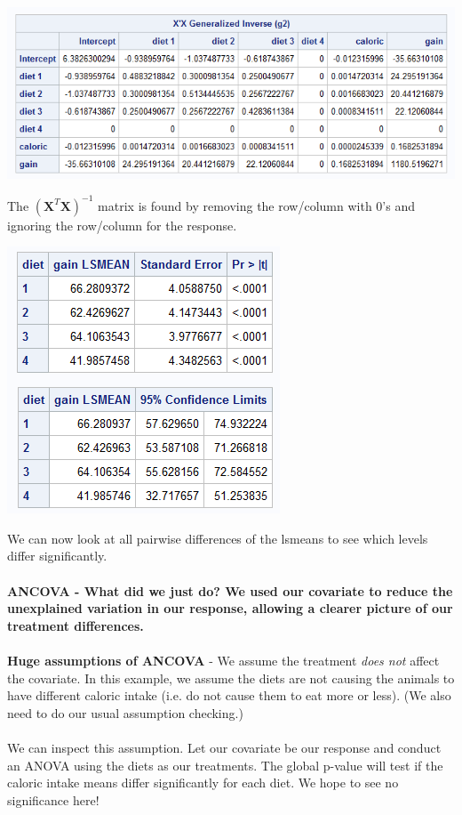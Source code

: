 \begin{center}
\includegraphics{DietsInverse}
\end{center}

The $(\textbf{X}^{T}\textbf{X})^{-1}$ matrix is found by removing the row/column with 0's and ignoring the row/column for the response.

\begin{center}
\includegraphics{DietsLSMeans}
\end{center}

We can now look at all pairwise differences of the lsmeans to see which levels differ significantly.\\~\\

\textbf{ANCOVA - What did we just do?  We used our covariate to reduce the unexplained variation in our response, allowing a clearer picture of our treatment differences. } \\~\\

\textbf{Huge assumptions of ANCOVA} - We assume the treatment \textit{does not} affect the covariate.  In this example, we assume the diets are not causing the animals to have different caloric intake (i.e. do not cause them to eat more or less). (We also need to do our usual assumption checking.)\\~\\
 We can inspect this assumption.  Let our covariate be our response and conduct an ANOVA using the diets as our treatments.  The global p-value will test if the caloric intake means differ significantly for each diet.  We hope to see no significance here!

